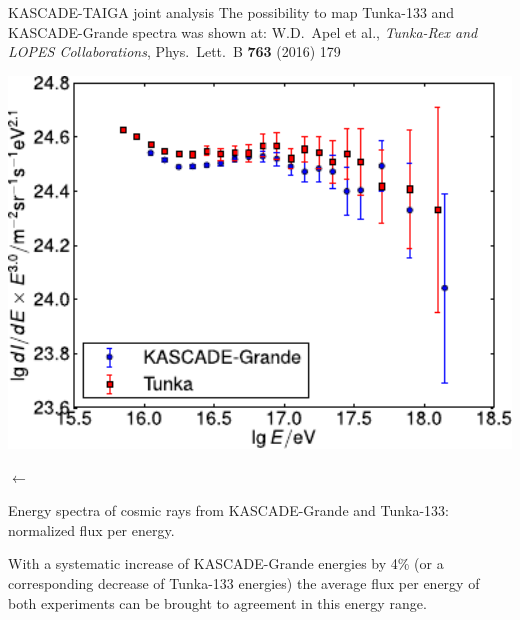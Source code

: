 \begin{frame}{KASCADE-TAIGA joint analysis}
\small
The possibility to map Tunka-133 and KASCADE-Grande spectra was shown at: W.D.~Apel et al., \textit{Tunka-Rex and LOPES Collaborations}, Phys.\ Lett.\ B \textbf{763} (2016) 179
\begin{center}
    \begin{minipage}{0.50\textwidth}
        \includegraphics[width=1\textwidth]{pics/KG_tunka133_scales.pdf}
    \end{minipage}
     $\longleftarrow$~
\begin{minipage}{0.38\textwidth}	
  Energy spectra of cosmic rays from KASCADE-Grande and Tunka-133: normalized flux per energy.
\end{minipage}
\end{center}

With a systematic increase of
KASCADE-Grande energies by 4\% (or a corresponding decrease of Tunka-133 energies) 
the average flux per energy of both experiments can be brought to agreement
in this energy range.
\end{frame}

